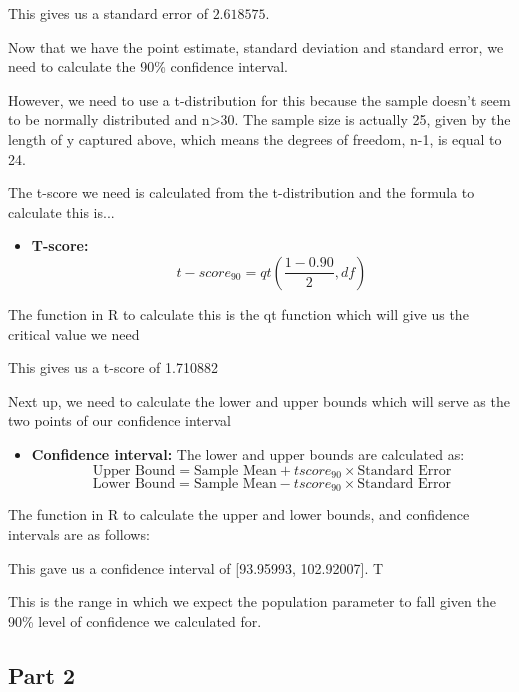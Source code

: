 \documentclass[12pt,letterpaper]{article}
\begin{document}
\begin{enumerate}
	This gives us a standard error of \(2.618575\).
	
	Now that we have the point estimate, standard deviation and standard error, we need to calculate the 90\% confidence interval.
	
	However, we need to use a t-distribution for this because the sample doesn't seem to be normally distributed and n>30. The sample size is actually 25, given by the length of y captured above, which means the degrees of freedom, n-1, is equal to 24.
	
	The t-score we need is calculated from the t-distribution and the formula to calculate this is...
	\begin{itemize}
		\item \textbf{T-score:} 
		\[
		t-score_{90} = qt\left(\frac{1 - 0.90}{2}, df\right)
		\]
	\end{itemize}
	
	The function in R to calculate this is the qt function which will give us the critical value we need
	 
	
This gives us a t-score of 1.710882

Next up, we need to calculate the lower and upper bounds which will serve as the two points of our confidence interval
	
	\begin{itemize}
		\item \textbf{Confidence interval:} The lower and upper bounds are calculated as:
		\[
		\text{Upper Bound} = \text{Sample Mean} + tscore_{90} \times \text{Standard Error}
		\]
		\[
		\text{Lower Bound} = \text{Sample Mean} - tscore_{90} \times \text{Standard Error}
		\]
	\end{itemize}
	
	The function in R to calculate the upper and lower bounds, and confidence intervals are as follows:
	
	
	This gave us a confidence interval of [93.95993, 102.92007]. T
	
	This is the range in which we expect the population parameter to fall given the 90\% level of confidence we calculated for.
	
	\subsection*{Part 2}
	

\end{enumerate}
\end{document}
